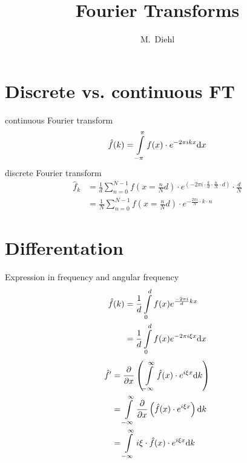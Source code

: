 \documentclass[12pt,numbers,sort&compress]{article}
\title{Fourier Transforms}
\author{M.~Diehl}
\newcommand{\inc}[1]{\ensuremath{\text d{#1}}}
\begin{document}
\maketitle
\section{Discrete vs. continuous FT}
continuous Fourier transform
\begin{equation}
\hat{f}(k) = \int \limits_{-\pi}^{\pi} f(x) \cdot e^{-2\pi i k x} \inc x
\end{equation}
discrete Fourier transform
\begin{align}
\hat{f}_k &=  \frac{1}{d} \sum\limits_{n=0}^{N-1} f \left( x = \frac{n}{N}d \right) \cdot e^{\left(-2 \pi i \cdot \frac{k}{d} \cdot \frac{n}{N} \cdot d \right)} \cdot \frac{d}{N}\\
&= \frac{1}{N} \sum \limits_{n=0}^{N-1} f \left( x = \frac{n}{N} d \right) \cdot e^{-\frac{2 \pi i}{N} \cdot k \cdot n} 
\end{align}

\section{Differentation}
Expression in frequency and angular frequency
\begin{align}
\hat{f}(k) &= \frac{1}{d} \int \limits_0^d f(x) e^{\frac{-2 \pi i}{d} k x}\\
&= \frac{1}{d} \int \limits_0^d f(x) e^{-2 \pi i \xi x} \inc x
\end{align}
\begin{align}
\hat{f}'&= \frac{\partial}{\partial x} \left( \int \limits_{-\infty }^{\infty} \hat{f}(x) \cdot e^{i \xi x} \inc k \right)\\
&=  \int \limits_{-\infty}^{\infty} \frac{\partial}{\partial x} \left( \hat{f}(x) \cdot e^{i \xi x} \right) \inc k\\
&= \int \limits_{-\infty}^{\infty} i \xi \cdot \hat{f}(x) \cdot e^{i \xi x} \inc k
\end{align}
\end{document}
